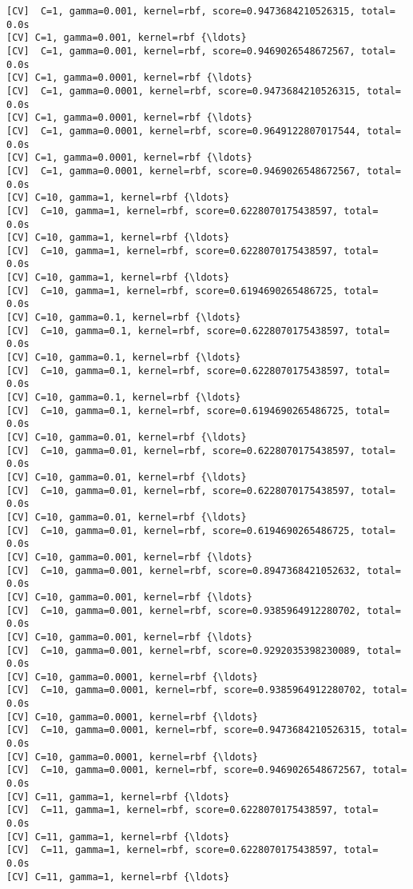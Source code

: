 \documentclass[11pt]{article}
\begin{document}
\begin{Verbatim}[commandchars=\\\{\}]
[CV]  C=1, gamma=0.001, kernel=rbf, score=0.9473684210526315, total=   0.0s
[CV] C=1, gamma=0.001, kernel=rbf {\ldots}
[CV]  C=1, gamma=0.001, kernel=rbf, score=0.9469026548672567, total=   0.0s
[CV] C=1, gamma=0.0001, kernel=rbf {\ldots}
[CV]  C=1, gamma=0.0001, kernel=rbf, score=0.9473684210526315, total=   0.0s
[CV] C=1, gamma=0.0001, kernel=rbf {\ldots}
[CV]  C=1, gamma=0.0001, kernel=rbf, score=0.9649122807017544, total=   0.0s
[CV] C=1, gamma=0.0001, kernel=rbf {\ldots}
[CV]  C=1, gamma=0.0001, kernel=rbf, score=0.9469026548672567, total=   0.0s
[CV] C=10, gamma=1, kernel=rbf {\ldots}
[CV]  C=10, gamma=1, kernel=rbf, score=0.6228070175438597, total=   0.0s
[CV] C=10, gamma=1, kernel=rbf {\ldots}
[CV]  C=10, gamma=1, kernel=rbf, score=0.6228070175438597, total=   0.0s
[CV] C=10, gamma=1, kernel=rbf {\ldots}
[CV]  C=10, gamma=1, kernel=rbf, score=0.6194690265486725, total=   0.0s
[CV] C=10, gamma=0.1, kernel=rbf {\ldots}
[CV]  C=10, gamma=0.1, kernel=rbf, score=0.6228070175438597, total=   0.0s
[CV] C=10, gamma=0.1, kernel=rbf {\ldots}
[CV]  C=10, gamma=0.1, kernel=rbf, score=0.6228070175438597, total=   0.0s
[CV] C=10, gamma=0.1, kernel=rbf {\ldots}
[CV]  C=10, gamma=0.1, kernel=rbf, score=0.6194690265486725, total=   0.0s
[CV] C=10, gamma=0.01, kernel=rbf {\ldots}
[CV]  C=10, gamma=0.01, kernel=rbf, score=0.6228070175438597, total=   0.0s
[CV] C=10, gamma=0.01, kernel=rbf {\ldots}
[CV]  C=10, gamma=0.01, kernel=rbf, score=0.6228070175438597, total=   0.0s
[CV] C=10, gamma=0.01, kernel=rbf {\ldots}
[CV]  C=10, gamma=0.01, kernel=rbf, score=0.6194690265486725, total=   0.0s
[CV] C=10, gamma=0.001, kernel=rbf {\ldots}
[CV]  C=10, gamma=0.001, kernel=rbf, score=0.8947368421052632, total=   0.0s
[CV] C=10, gamma=0.001, kernel=rbf {\ldots}
[CV]  C=10, gamma=0.001, kernel=rbf, score=0.9385964912280702, total=   0.0s
[CV] C=10, gamma=0.001, kernel=rbf {\ldots}
[CV]  C=10, gamma=0.001, kernel=rbf, score=0.9292035398230089, total=   0.0s
[CV] C=10, gamma=0.0001, kernel=rbf {\ldots}
[CV]  C=10, gamma=0.0001, kernel=rbf, score=0.9385964912280702, total=   0.0s
[CV] C=10, gamma=0.0001, kernel=rbf {\ldots}
[CV]  C=10, gamma=0.0001, kernel=rbf, score=0.9473684210526315, total=   0.0s
[CV] C=10, gamma=0.0001, kernel=rbf {\ldots}
[CV]  C=10, gamma=0.0001, kernel=rbf, score=0.9469026548672567, total=   0.0s
[CV] C=11, gamma=1, kernel=rbf {\ldots}
[CV]  C=11, gamma=1, kernel=rbf, score=0.6228070175438597, total=   0.0s
[CV] C=11, gamma=1, kernel=rbf {\ldots}
[CV]  C=11, gamma=1, kernel=rbf, score=0.6228070175438597, total=   0.0s
[CV] C=11, gamma=1, kernel=rbf {\ldots}

\end{Verbatim}
\end{document}
